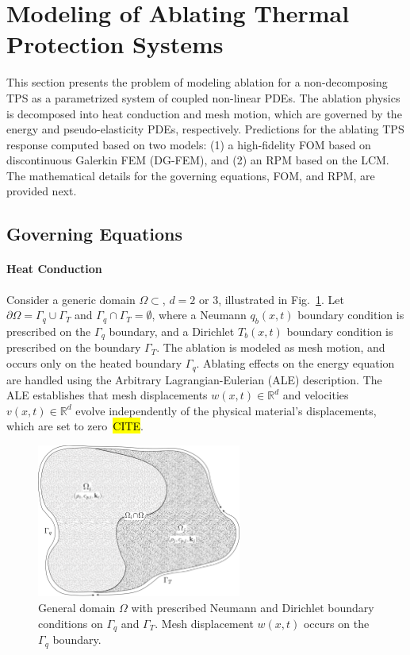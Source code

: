 \section{Modeling of Ablating Thermal Protection Systems}

This section presents the problem of modeling ablation for a non-decomposing TPS as a parametrized system of coupled non-linear PDEs. The ablation physics is decomposed into heat conduction and mesh motion, which are governed by the energy and pseudo-elasticity PDEs, respectively. Predictions for the ablating TPS response computed based on two models: (1) a high-fidelity FOM based on discontinuous Galerkin FEM (DG-FEM), and (2) an RPM based on the LCM. The mathematical details for the governing equations, FOM, and RPM, are provided next.

\subsection{Governing Equations}\label{sec_governing_equations}

\paragraph*{Heat Conduction} Consider a generic domain $\Omega\subset$, $d=2$ or $3$, illustrated in Fig.~\ref{fig_general_domain}. Let $\partial\Omega = \Gamma_q\cup\Gamma_T$ and $\Gamma_q\cap\Gamma_T = \emptyset$, where a Neumann $q_b(x,t)$ boundary condition is prescribed on the $\Gamma_q$ boundary, and a Dirichlet $T_b(x,t)$ boundary condition is prescribed on the boundary $\Gamma_T$. The ablation is modeled as mesh motion, and occurs only on the heated boundary $\Gamma_q$. Ablating effects on the energy equation are handled using the Arbitrary Lagrangian-Eulerian (ALE) description. The ALE establishes that mesh displacements $w(x,t)\in\mathbb{R}^d$ and velocities $v(x,t)\in\mathbb{R}^d$ evolve independently of the physical material's displacements, which are set to zero~\hl{CITE}.

\begin{figure}
    \centering
    \includegraphics[width=0.6\textwidth]{./figs/general_domain.png}
    \caption{General domain $\Omega$ with prescribed Neumann and Dirichlet boundary conditions on $\Gamma_q$ and $\Gamma_T$. Mesh displacement $w(x,t)$ occurs on the $\Gamma_q$ boundary.}
    \label{fig_general_domain}
\end{figure}

